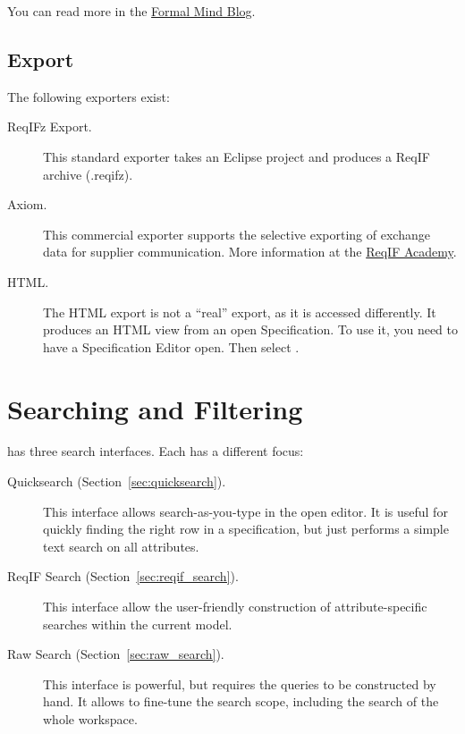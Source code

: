 You can read more in the \href{http://formalmind.com/blog/new-stuff-new-committer-new-product-new-importer-new-release}{Formal Mind Blog}.

\subsection{Export}

The following exporters exist:

\begin{description}
\item[ReqIFz Export.] This standard exporter takes an Eclipse project and produces a ReqIF archive (.reqifz).

\item[Axiom.] This commercial exporter supports the selective exporting of exchange data for supplier communication.  More information at the \href{https://reqif.academy}{ReqIF Academy}.

\item[HTML.] The HTML export is not a ``real'' export, as it is accessed differently.  It produces an HTML view from an open Specification.  To use it, you need to have a Specification Editor open.  Then select .
\end{description}

\section{Searching and Filtering}
\label{sec:search}

\pror{} has three search interfaces.  Each has a different focus:

\begin{description}
\item[Quicksearch (Section~\ref{sec:quicksearch}).] This interface allows search-as-you-type in the open editor.  It is useful for quickly finding the right row in a specification, but just performs a simple text search on all attributes.
\item[ReqIF Search (Section~\ref{sec:reqif_search}).] This interface allow the user-friendly construction of attribute-specific searches within the current model.
\item[Raw Search (Section~\ref{sec:raw_search}).] This interface is powerful, but requires the queries to be constructed by hand.  It allows to fine-tune the search scope, including the search of the whole workspace.
\end{description}

